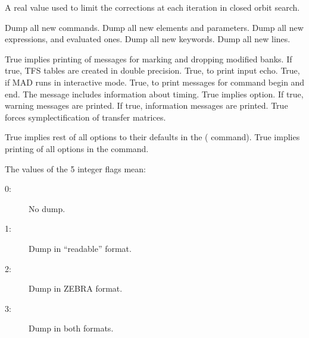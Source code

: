 \begin{mylist}
A real value used to limit the corrections at each iteration in closed
orbit search.

Dump all new commands.
Dump all new elements and parameters.
Dump all new expressions, and evaluated ones.
Dump all new keywords.
Dump all new lines.

True implies printing of messages for marking and dropping modified
banks.
If true, TFS tables are created in double precision.
True, to print input echo.
True, if MAD runs in interactive mode.
True, to print messages for command begin and end.
The message includes information about timing.
True implies  option.
If true, warning messages are printed.
If true, information messages are printed.
True forces symplectification of transfer matrices.

True implies rest of all options to their defaults in the
( command).
True implies printing of all options in the  command.
\end{mylist}

The values of the 5 integer flags mean:
\begin{description}
\item[0:]
No dump.
\item[1:]
Dump in ``readable'' format.
\item[2:]
Dump in ZEBRA format.
\item[3:]
Dump in both formats.
\end{description}
 
